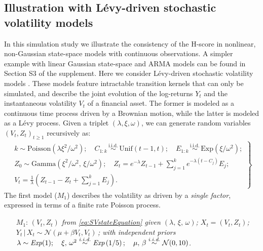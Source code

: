 \documentclass[12pt]{article}
\theoremstyle{plain}
\theoremstyle{definition}
\newcommand{\suppconsistencyTimeSeries}{ S3 }
\begin{document}
	\subsection{Illustration with L\'{e}vy-driven stochastic volatility models}
	\label{example:applicationsSV}
	In this simulation study we illustrate the consistency of the H-score
	in nonlinear, non-Gaussian state-space models with continuous
	observations. 
	A simpler example with linear Gaussian state-space and ARMA models can be found
	in Section\suppconsistencyTimeSeries of the supplement. Here we
	consider L\'{e}vy-driven stochastic volatility models 
	\citep{barndorff2011,bns:real}. These models feature intractable transition kernels 
	that can only be simulated, and describe the joint
	evolution of
	the log-returns $Y_t$ and the instantaneous volatility $V_t$ of a financial
	asset. The former is modeled as a continuous time process driven by a Brownian
	motion, while the latter is modeled as a L\'{e}vy process. 
	Given a triplet $(\lambda,\xi,\omega)$, we can generate random
	variables $(V_{t},Z_{t})_{t\geq 1}$ recursively as:
	{
		\begin{align}
		\left.
		\begin{array}{ll}
		\!k \sim \text{Poisson}\left(\lambda\xi^2/\omega^2\right) ;\quad  C_{1:k}\,\stackrel{\text{i.i.d.}}{\sim}\,\text{Unif}(t-1,t) ;\quad  E_{1:k}\,\stackrel{\text{i.i.d.}}{\sim}\,\text{Exp}\left(\xi/\omega^2\right) ;
		\\
		\!Z_0 \sim\text{Gamma}\left({\xi^2}/{\omega^2},\,{\xi}/{\omega^2}\right) ;\quad Z_{t} = e^{-\lambda}Z_{t-1} + \sum_{j=1}^k e^{-\lambda\left(t-C_j\right)}E_j ;
		\\  
		V_{t} = \frac{1}{\lambda}\left(Z_{t-1}-Z_{t}+\sum_{j=1}^k E_j\right).
		\end{array}
		\right\}
		\label{eq:SVstateEquation}
		\end{align}
	}
	The first model ($M_1$) describes the volatility as driven by a \emph{single factor}, expressed in terms of a finite rate Poisson process.
	\begin{itemize}
		\item [$M_1$:]\textit{$(V_{t},Z_{t})$ from \eqref{eq:SVstateEquation} given $(\lambda,\,\xi,\,\omega)$; \quad $X_{t}=(V_{t},Z_{t})$;\quad $Y_{t}\,|\,X_t \sim \mathcal{N}\left(\mu + \beta V_{t}, V_{t}\right)$\,; \quad with independent priors \,$\lambda\sim\emph{\text{Exp}}(1);\quad \xi,\,\omega^2 \stackrel{\emph{\text{i.i.d.}}}{\sim} \emph{\text{Exp}}\left(1/5\right) ;\quad \mu,\,\beta \stackrel{\emph{\text{i.i.d.}}}{\sim} \mathcal{N}(0,10)$.}
	\end{itemize}
\end{document}

